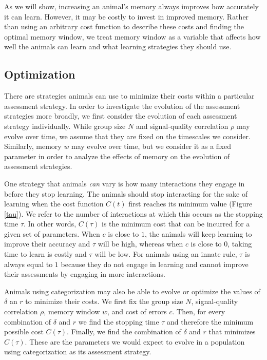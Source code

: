 As we will show, increasing an animal's memory always improves how accurately it can learn. However, it may be costly to invest in improved memory. Rather than using an arbitrary cost function to describe these costs and finding the optimal memory window, we treat memory window as a variable that affects how well the animals can learn and what learning strategies they should use. 

\subsection{Optimization }
There are strategies animals can use to minimize their costs within a particular assessment strategy. In order to investigate the evolution of the assessment strategies more broadly, we first consider the evolution of each assessment strategy individually. While group size $N$ and signal-quality correlation $\rho$ may evolve over time, we assume that they are fixed on the timescales we consider. Similarly, memory $w$ may evolve over time, but we consider it as a fixed parameter in order to analyze the effects of memory on the evolution of assessment strategies. 

One strategy that animals \emph{can} vary is how many interactions they engage in before they stop learning. The animals should stop interacting for the sake of learning when the cost function $C(t)$ first reaches its minimum value (Figure \ref{tau}). We refer to the number of interactions at which this occurs as the stopping time $\tau$. In other words, $C(\tau)$ is the minimum cost that can be incurred for a given set of parameters. When $c$ is close to $1$, the animals will keep learning to improve their accuracy and $\tau$ will be high, whereas when $c$ is close to $0$, taking time to learn is costly and $\tau$ will be low. For animals using an innate rule, $\tau$ is always equal to $1$ because they do not engage in learning and cannot improve their assessments by engaging in more interactions. 

Animals using categorization may also be able to evolve or optimize the values of $\delta$ an $r$ to minimize their costs. We first fix the group size $N$, signal-quality correlation $\rho$, memory window $w$, and cost of errors $c$. Then, for every combination of $\delta$ and $r$ we find the stopping time $\tau$ and therefore the minimum possible cost $C(\tau)$. Finally, we find the combination of $\delta$ and $r$ that minimizes $C(\tau)$. These are the parameters we would expect to evolve in a population using categorization as its assessment strategy. 

